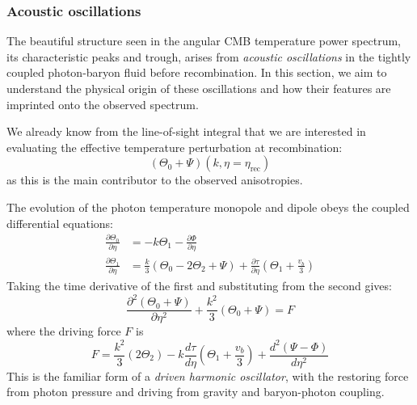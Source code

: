 \documentclass{aa}
\numberwithin{equation}{section}
\numberwithin{table}{section}
\numberwithin{figure}{section}
\begin{document}



\subsubsection{Acoustic oscillations}
\color{Plum}
The beautiful structure seen in the angular CMB temperature power spectrum, its characteristic peaks and trough, arises from \textit{acoustic oscillations} in the tightly coupled photon-baryon fluid before recombination. In this section, we aim to understand the physical origin of these oscillations and how their features are imprinted onto the observed spectrum.

We already know from the line-of-sight integral that we are interested in evaluating the effective temperature perturbation at recombination:
\begin{equation}
(\Theta_0 + \Psi)(k, \eta = \eta_{\mathrm{rec}})
\end{equation}
as this is the main contributor to the observed anisotropies.

The evolution of the photon temperature monopole and dipole obeys the coupled differential equations:
\begin{align}
\frac{\partial \Theta_0}{\partial \eta} &= -k \Theta_1 - \frac{\partial \Phi}{\partial \eta} \\
\frac{\partial \Theta_1}{\partial \eta} &= \frac{k}{3} (\Theta_0 - 2 \Theta_2 + \Psi) + \frac{\partial \tau}{\partial \eta} \left( \Theta_1 + \frac{v_b}{3} \right)
\end{align}
Taking the time derivative of the first and substituting from the second gives:
\begin{equation}
\frac{\partial^2 (\Theta_0 + \Psi)}{\partial \eta^2} + \frac{k^2}{3} (\Theta_0 + \Psi) = F
\end{equation}
where the driving force $F$ is
\begin{equation}
F = \frac{k^2}{3}(2\Theta_2) - k \frac{d\tau}{d\eta}\left(\Theta_1 + \frac{v_b}{3}\right) + \frac{d^2(\Psi - \Phi)}{d\eta^2}
\end{equation}
This is the familiar form of a \textit{driven harmonic oscillator}, with the restoring force from photon pressure and driving from gravity and baryon-photon coupling.
\end{document}
